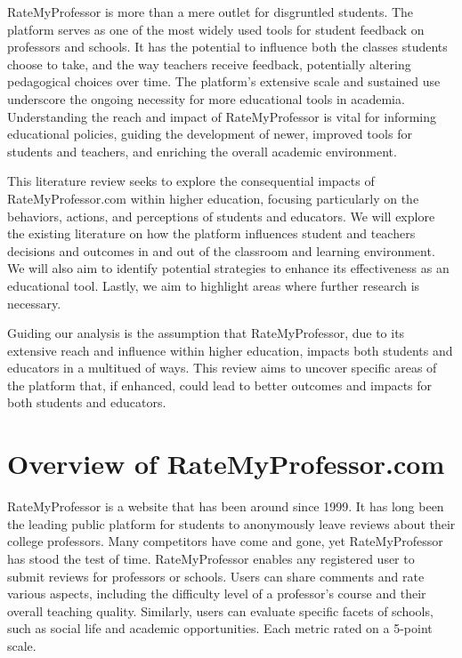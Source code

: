 \documentclass[twocolumn, doc,12pt]{apa7}
\begin{document}
RateMyProfessor is more than a mere outlet for disgruntled students. The platform serves as one of the most widely used tools for student feedback on professors and schools. It has the potential to influence both the classes students choose to take, and the way teachers receive feedback, potentially altering pedagogical choices over time.  The platform's extensive scale and sustained use underscore the ongoing necessity for more educational tools in academia. Understanding the reach and impact of RateMyProfessor is vital for informing educational policies, guiding the development of newer, improved tools for students and teachers, and enriching the overall academic environment.

This literature review seeks to explore the consequential impacts of RateMyProfessor.com within higher education, focusing particularly on the behaviors, actions, and perceptions of students and educators. We will explore the existing literature on how the platform influences student and teachers decisions and outcomes in and out of the classroom and learning environment. We will also aim to identify potential strategies to enhance its effectiveness as an educational tool. Lastly, we aim to highlight areas where further research is necessary. 

Guiding our analysis is the assumption that RateMyProfessor, due to its extensive reach and influence within higher education, impacts both students and educators in a multitued of ways. This review aims to uncover specific areas of the platform that, if enhanced, could lead to better outcomes and impacts for both students and educators.

\section{Overview of RateMyProfessor.com}
RateMyProfessor is a website that has been around since 1999. It has long been the leading public platform for students to anonymously leave reviews about their college professors. Many competitors have come and gone, yet RateMyProfessor has stood the test of time. 
RateMyProfessor enables any registered user to submit reviews for professors or schools. Users can share comments and rate various aspects, including the difficulty level of a professor's course and their overall teaching quality. Similarly, users can evaluate specific facets of schools, such as social life and academic opportunities. Each metric rated on a 5-point scale.
\end{document}
